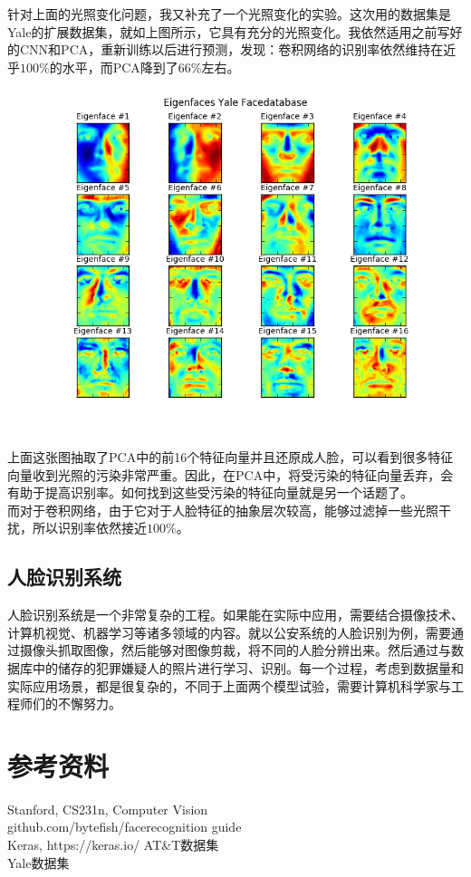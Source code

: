 \documentclass{article}
\begin{document}
针对上面的光照变化问题，我又补充了一个光照变化的实验。这次用的数据集是Yale的扩展数据集，就如上图所示，它具有充分的光照变化。我依然适用之前写好的CNN和PCA，重新训练以后进行预测，发现：卷积网络的识别率依然维持在近乎$100\%$的水平，而PCA降到了$66\%$左右。\\

\begin{center}
\includegraphics[width=0.8\linewidth]{../image/eigenfacesYale.png}\\
\end{center}

上面这张图抽取了PCA中的前16个特征向量并且还原成人脸，可以看到很多特征向量收到光照的污染非常严重。因此，在PCA中，将受污染的特征向量丢弃，会有助于提高识别率。如何找到这些受污染的特征向量就是另一个话题了。\\

而对于卷积网络，由于它对于人脸特征的抽象层次较高，能够过滤掉一些光照干扰，所以识别率依然接近$100\%$。

\subsection{人脸识别系统}

人脸识别系统是一个非常复杂的工程。如果能在实际中应用，需要结合摄像技术、计算机视觉、机器学习等诸多领域的内容。就以公安系统的人脸识别为例，需要通过摄像头抓取图像，然后能够对图像剪裁，将不同的人脸分辨出来。然后通过与数据库中的储存的犯罪嫌疑人的照片进行学习、识别。每一个过程，考虑到数据量和实际应用场景，都是很复杂的，不同于上面两个模型试验，需要计算机科学家与工程师们的不懈努力。

\section{参考资料}

Stanford, CS231n, Computer Vision\\
github.com/bytefish/facerecognition guide\\
Keras, https://keras.io/
AT\&T数据集\\
Yale数据集\\
\end{document}
